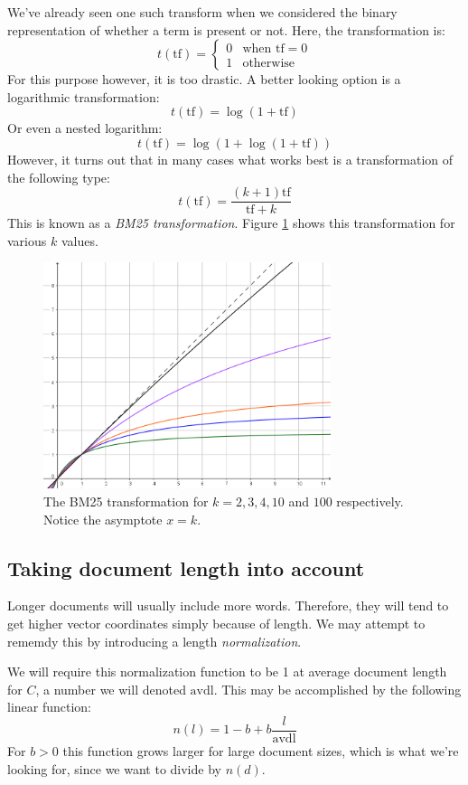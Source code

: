 \documentclass[12pt, a4paper]{article}
\numberwithin{equation}{section}
\begin{document}
We've already seen one such transform when we considered the binary representation of whether a term is present or not. Here, the transformation is:
\begin{equation}
t(\textrm{tf})=
\begin{cases}
0 & \textrm{when }\textrm{tf}=0 \\
1 & \textrm{otherwise}
\end{cases}
\end{equation}
For this purpose however, it is too drastic. A better looking option is a logarithmic transformation:
\begin{equation}
t(\textrm{tf})=\log(1+\textrm{tf})
\end{equation}
Or even a nested logarithm:
\begin{equation}
t(\textrm{tf})=\log(1+\log(1+\textrm{tf}))
\end{equation}
However, it turns out that in many cases what works best is a transformation of the following type:
\begin{equation}
t(\textrm{tf})=\frac{(k+1)\textrm{tf}}{\textrm{tf}+k}
\end{equation}
This is known as a \textit{BM25 transformation}. Figure \ref{fig:bm25} shows this transformation for various $k$ values.

\begin{figure}
\centering
\includegraphics[width=0.75\textwidth]{bm25}
\caption{The BM25 transformation for $k=2, 3, 4, 10$ and $100$ respectively. Notice the asymptote $x=k$.}
\label{fig:bm25}
\end{figure}

\subsection{Taking document length into account}
Longer documents will usually include more words. Therefore, they will tend to get higher vector coordinates simply because of length. We may attempt to rememdy this by introducing a length \textit{normalization}.

We will require this normalization function to be 1 at average document length for $C$, a number we will denoted $\textrm{avdl}$. This may be accomplished by the following linear function:
\begin{equation}
n(l)=1-b+b\frac{l}{\textrm{avdl}}
\end{equation}
For $b>0$ this function grows larger for large document sizes, which is what we're looking for, since we want to divide by $n(d)$.
\end{document}
